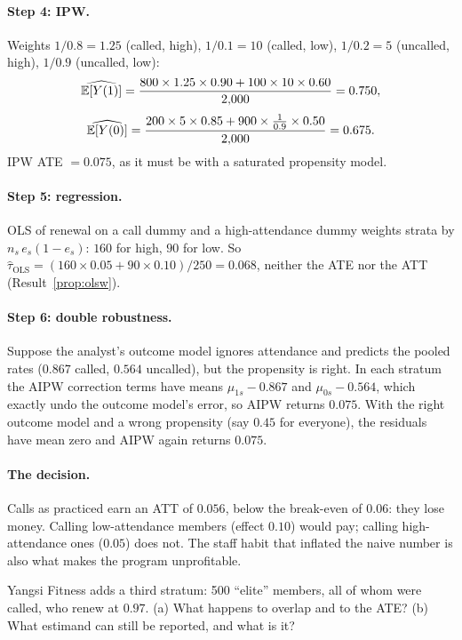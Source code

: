 \documentclass[11pt]{article}
\begin{document}
\paragraph{Step 4: IPW.} Weights $1/0.8 = 1.25$ (called, high), $1/0.1 = 10$ (called, low), $1/0.2 = 5$ (uncalled, high), $1/0.9$ (uncalled,
low):
\[
  \widehat{\mathbb{E}[Y(1)]} = \frac{800 \times 1.25 \times 0.90 + 100 \times 10 \times 0.60}{2{,}000} = 0.750,
\]
\[
  \widehat{\mathbb{E}[Y(0)]} = \frac{200 \times 5 \times 0.85 + 900 \times \tfrac{1}{0.9} \times 0.50}{2{,}000} = 0.675 .
\]
IPW ATE $= 0.075$, as it must be with a saturated propensity model.

\paragraph{Step 5: regression.} OLS of renewal on a call dummy and a high-attendance dummy weights strata by
$n_s\,e_s(1-e_s)$: $160$ for high, $90$ for low. So $\hat\tau_{\text{OLS}} = (160 \times 0.05 + 90 \times 0.10)/250 = 0.068$, neither the ATE nor
the ATT (Result~\ref{prop:olsw}).

\paragraph{Step 6: double robustness.} Suppose the analyst's outcome model ignores attendance and predicts the pooled rates
($0.867$ called, $0.564$ uncalled), but the propensity is right. In each stratum the AIPW correction terms have means
$\mu_{1s} - 0.867$ and $\mu_{0s} - 0.564$, which exactly undo the outcome model's error, so AIPW returns $0.075$. With the right outcome
model and a wrong propensity (say $0.45$ for everyone), the residuals have mean zero and AIPW again returns $0.075$.

\paragraph{The decision.} Calls as practiced earn an ATT of $0.056$, below the break-even of $0.06$: they lose money. Calling
low-attendance members (effect $0.10$) would pay; calling high-attendance ones ($0.05$) does not. The staff habit that inflated the
naive number is also what makes the program unprofitable.

\begin{exercise}[computation]
Yangsi Fitness adds a third stratum: 500 ``elite'' members, all of whom were called, who renew at $0.97$. (a) What happens to overlap and to
the ATE? (b) What estimand can still be reported, and what is it?
\end{exercise}
\end{document}
